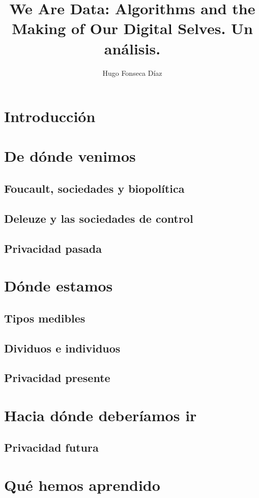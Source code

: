 \documentclass[11pt]{article}
\begin{document}
\title{We Are Data: Algorithms and the Making of Our Digital Selves. Un análisis.}
\author{Hugo Fonseca Díaz\\ }
\maketitle
\section{Introducción}
\section{De dónde venimos}
\subsection{Foucault, sociedades y biopolítica}
\subsection{Deleuze y las sociedades de control}
\subsection{Privacidad pasada}
\section{Dónde estamos}
\subsection{Tipos medibles}
\subsection{Dividuos e individuos}
\subsection{Privacidad presente}
\section{Hacia dónde deberíamos ir}
\subsection{Privacidad futura}
\section{Qué hemos aprendido}
\begin{thebibliography}{8}
\end{thebibliography}
\end{document}
